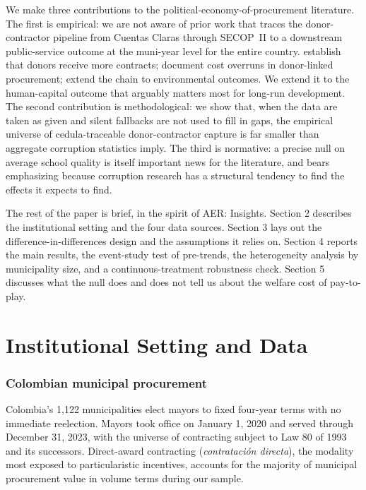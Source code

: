 \documentclass[12pt]{article}
\begin{document}
We make three contributions to the political-economy-of-procurement literature. The first is empirical: we are not aware of prior work that traces the donor-contractor pipeline from Cuentas Claras through SECOP~II to a downstream public-service outcome at the muni-year level for the entire country. \citet{gulzar2022contracts} establish that donors receive more contracts; \citet{riano2024donors} document cost overruns in donor-linked procurement; \citet{paschke2024deforestation} extend the chain to environmental outcomes. We extend it to the human-capital outcome that arguably matters most for long-run development. The second contribution is methodological: we show that, when the data are taken as given and silent fallbacks are not used to fill in gaps, the empirical universe of cedula-traceable donor-contractor capture is far smaller than aggregate corruption statistics imply. The third is normative: a precise null on average school quality is itself important news for the literature, and bears emphasizing because corruption research has a structural tendency to find the effects it expects to find.

The rest of the paper is brief, in the spirit of AER: Insights. Section 2 describes the institutional setting and the four data sources. Section 3 lays out the difference-in-differences design and the assumptions it relies on. Section 4 reports the main results, the event-study test of pre-trends, the heterogeneity analysis by municipality size, and a continuous-treatment robustness check. Section 5 discusses what the null does and does not tell us about the welfare cost of pay-to-play.

\section{Institutional Setting and Data}

\subsubsection*{Colombian municipal procurement} Colombia's 1{,}122 municipalities elect mayors to fixed four-year terms with no immediate reelection. Mayors took office on January 1, 2020 and served through December 31, 2023, with the universe of contracting subject to Law 80 of 1993 and its successors. Direct-award contracting (\textit{contrataci\'on directa}), the modality most exposed to particularistic incentives, accounts for the majority of municipal procurement value in volume terms during our sample.
\end{document}
